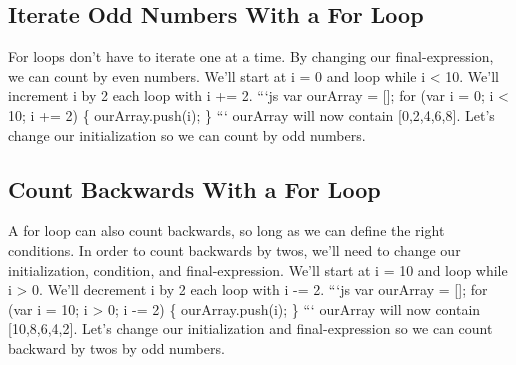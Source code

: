 \documentclass{article}%
\begin{document}
\subsection{Iterate Odd Numbers With a For Loop}%
\label{subsec:IterateOddNumbersWithaForLoop}%
For loops don't have to iterate one at a time. By changing our final{-}expression, we can count by even numbers.\newline%
We'll start at i = 0 and loop while i < 10. We'll increment i by 2 each loop with i += 2.\newline%
```js\newline%
var ourArray = {[}{]};\newline%
for (var i = 0; i < 10; i += 2) \{\newline%
  ourArray.push(i);\newline%
\}\newline%
```\newline%
ourArray will now contain {[}0,2,4,6,8{]}.\newline%
Let's change our initialization so we can count by odd numbers.\newline%

%
\subsection{Count Backwards With a For Loop}%
\label{subsec:CountBackwardsWithaForLoop}%
A for loop can also count backwards, so long as we can define the right conditions.\newline%
In order to count backwards by twos, we'll need to change our initialization, condition, and final{-}expression.\newline%
We'll start at i = 10 and loop while i > 0. We'll decrement i by 2 each loop with i {-}= 2.\newline%
```js\newline%
var ourArray = {[}{]};\newline%
for (var i = 10; i > 0; i {-}= 2) \{\newline%
  ourArray.push(i);\newline%
\}\newline%
```\newline%
ourArray will now contain {[}10,8,6,4,2{]}.\newline%
Let's change our initialization and final{-}expression so we can count backward by twos by odd numbers.\newline%

%
\end{document}
